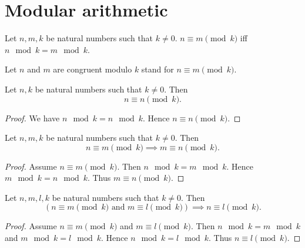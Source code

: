 \documentclass[../arithmetic.tex]{subfiles}
\begin{document}
  \section{Modular arithmetic}

  \begin{forthel}
    \begin{definition}
      Let $n, m, k$ be natural numbers such that $k \neq 0$.
      $n \equiv m \pmod{k}$ iff $n \mod k = m \mod k$.
    \end{definition}

    Let $n$ and $m$ are congruent modulo $k$ stand for $n \equiv m \pmod{k}$.
  \end{forthel}

  \begin{forthel}
    \begin{proposition}
      Let $n, k$ be natural numbers such that $k \neq 0$.
      Then \[ n \equiv n \pmod{k}. \]
    \end{proposition}
    \begin{proof}
      We have $n \mod k = n \mod k$.
      Hence $n \equiv n \pmod{k}$.
    \end{proof}
  \end{forthel}

  \begin{forthel}
    \begin{proposition}
      Let $n, m, k$ be natural numbers such that $k \neq 0$.
      Then \[ n \equiv m \pmod{k} \implies m \equiv n \pmod{k}. \]
    \end{proposition}
    \begin{proof}
      Assume $n \equiv m \pmod{k}$.
      Then $n \mod k = m \mod k$.
      Hence $m \mod k = n \mod k$.
      Thus $m \equiv n \pmod{k}$.
    \end{proof}
  \end{forthel}

  \begin{forthel}
    \begin{proposition}
      Let $n, m, l, k$ be natural numbers such that $k \neq 0$.
      Then \[ (\text{$n \equiv m \pmod{k}$ and $m \equiv l \pmod{k}$}) \implies
      n \equiv l \pmod{k}. \]
    \end{proposition}
    \begin{proof}
      Assume $n \equiv m \pmod{k}$ and $m \equiv l \pmod{k}$.
      Then $n \mod k = m \mod k$ and $m \mod k = l \mod k$.
      Hence $n \mod k = l \mod k$.
      Thus $n \equiv l \pmod{k}$.
    \end{proof}
  \end{forthel}
\end{document}
